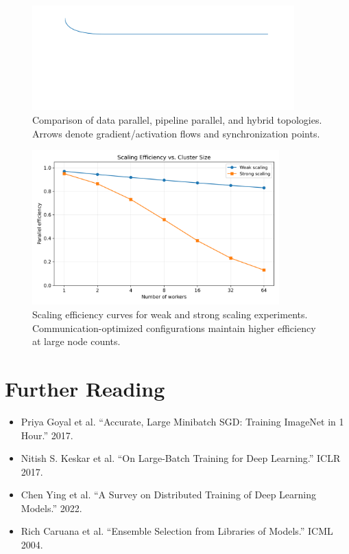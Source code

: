\documentclass{article}
\begin{document}
\begin{figure}[H]
  \centering
  \includegraphics[width=0.9\textwidth]{distributed_training_topologies.png}
  \caption{Comparison of data parallel, pipeline parallel, and hybrid topologies. Arrows denote gradient/activation flows and synchronization points.}
  \label{fig:distributed_training_topologies}
\end{figure}

\begin{figure}[H]
  \centering
  \includegraphics[width=0.85\textwidth]{scaling_efficiency.png}
  \caption{Scaling efficiency curves for weak and strong scaling experiments. Communication-optimized configurations maintain higher efficiency at large node counts.}
  \label{fig:scaling_efficiency}
\end{figure}
\FloatBarrier

\section*{Further Reading}
\begin{itemize}
  \item Priya Goyal et al. ``Accurate, Large Minibatch SGD: Training ImageNet in 1 Hour.'' 2017.
  \item Nitish S. Keskar et al. ``On Large-Batch Training for Deep Learning.'' ICLR 2017.
  \item Chen Ying et al. ``A Survey on Distributed Training of Deep Learning Models.'' 2022.
  \item Rich Caruana et al. ``Ensemble Selection from Libraries of Models.'' ICML 2004.
\end{itemize}
\end{document}
